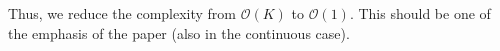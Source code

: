 Thus, we reduce the complexity from $\mathcal{O}(K)$ to $\mathcal{O}(1)$. This should be one of the emphasis of the paper (also in the continuous case).




\fi


\iffalse
